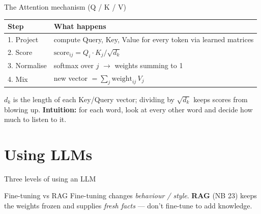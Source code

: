 \documentclass[aspectratio=169,11pt]{beamer}
\begin{document}
\begin{frame}{The Attention mechanism (Q / K / V)}
  \small
  \begin{center}
  \begin{tabular}{ll}
    \toprule
    \textbf{Step} & \textbf{What happens} \\
    \midrule
    1. Project   & compute Query, Key, Value for every token via learned matrices \\
    2. Score     & $\mathrm{score}_{ij} = Q_i \cdot K_j / \sqrt{d_k}$ \\
    3. Normalise & softmax over $j$ $\to$ weights summing to 1 \\
    4. Mix       & new vector $= \sum_j \mathrm{weight}_{ij}\, V_j$ \\
    \bottomrule
  \end{tabular}
  \end{center}
  \vspace{2pt}
  {\footnotesize $d_k$ is the length of each Key/Query vector; dividing by $\sqrt{d_k}$ keeps scores from blowing up. \textbf{Intuition:} for each word, look at every other word and decide how much to listen to it.}
\end{frame}

\section{Using LLMs}
\begin{frame}{Three levels of using an LLM}
  \begin{center}
  \end{center}
  \begin{exampleblock}{Fine-tuning vs RAG}
    Fine-tuning changes \emph{behaviour / style}. \textbf{RAG} (NB 23) keeps the weights frozen and supplies \emph{fresh facts} --- don't fine-tune to add knowledge.
  \end{exampleblock}
\end{frame}
\end{document}
